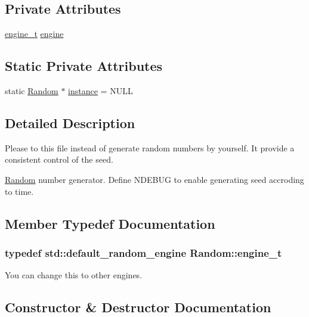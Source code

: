 \subsection*{Private Attributes}
\begin{DoxyCompactItemize}
\item 
\hyperlink{classRandom_ab1090b767f3e771eb8f846079869d1b4}{engine\+\_\+t} \hyperlink{classRandom_a273901a5b482668a1a0204b8691317e1}{engine}
\end{DoxyCompactItemize}
\subsection*{Static Private Attributes}
\begin{DoxyCompactItemize}
\item 
static \hyperlink{classRandom}{Random} $\ast$ \hyperlink{classRandom_a841a26400e4205f27cfb1ab4acaccb46}{instance} = N\+U\+L\+L
\end{DoxyCompactItemize}


\subsection{Detailed Description}
Please to this file instead of generate random numbers by yourself. It provide a consistent control of the seed. 

\hyperlink{classRandom}{Random} number generator. Define N\+D\+E\+B\+U\+G to enable generating seed accroding to time. 

\subsection{Member Typedef Documentation}
\hypertarget{classRandom_ab1090b767f3e771eb8f846079869d1b4}{}
\subsubsection[{engine\+\_\+t}]{\setlength{\rightskip}{0pt plus 5cm}typedef std\+::default\+\_\+random\+\_\+engine {\bf Random\+::engine\+\_\+t}}\label{classRandom_ab1090b767f3e771eb8f846079869d1b4}


You can change this to other engines. 



\subsection{Constructor \& Destructor Documentation}
\hypertarget{classRandom_a9bfadeaa4adc5ac44142d000b1c99441}{}

